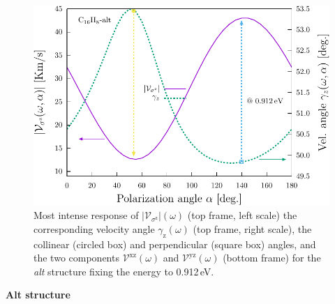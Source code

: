 \documentclass[prb,11pt,tightenlines,twocolumn,aps]{revtex4-1}
\begin{document}
\begin{figure}[t]
    \centering
    \includegraphics[width=\linewidth]{altplots/alt-vaz-rag}
    \caption{Most intense response of
    $|\mathcal{V}_{\sigma^{\mathrm{z}}}|(\omega)$ (top frame, left scale) the
    corresponding velocity angle $\gamma_{\mathrm{z}}(\omega)$ (top frame, right
    scale), the collinear (circled box) and perpendicular (square box) angles,
    and the two components $\mathcal{V}^{\mathrm{xz}}(\omega)$ and
    $\mathcal{V}^{\mathrm{yz}}(\omega)$ (bottom frame) for the \emph{alt}
    structure fixing the energy to 0.912\,eV.}
    \label{fig:alt-vaz-rag}
\end{figure}

\textbf{Alt structure}
\end{document}
